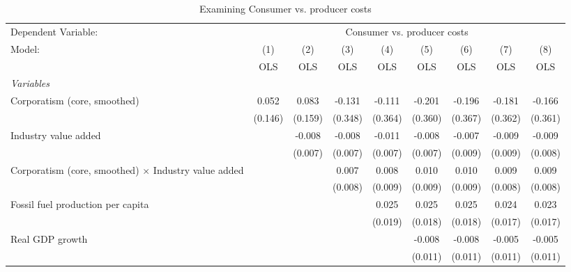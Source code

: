 
\begin{table}[htbp]
   \caption{Examining Consumer vs. producer costs}
   \centering
   \begin{tabular}{lcccccccc}
      \toprule
      Dependent Variable: & \multicolumn{8}{c}{Consumer vs. producer costs}\\
      Model:                                                      & (1)     & (2)     & (3)     & (4)     & (5)     & (6)     & (7)     & (8)\\  
                                                                  &  OLS    & OLS     & OLS     & OLS     & OLS     & OLS     & OLS     & OLS\\  
      \midrule
      \emph{Variables}\\
      Corporatism (core, smoothed)                                & 0.052   & 0.083   & -0.131  & -0.111  & -0.201  & -0.196  & -0.181  & -0.166\\   
                                                                  & (0.146) & (0.159) & (0.348) & (0.364) & (0.360) & (0.367) & (0.362) & (0.361)\\   
      Industry value added                                        &         & -0.008  & -0.008  & -0.011  & -0.008  & -0.007  & -0.009  & -0.009\\   
                                                                  &         & (0.007) & (0.007) & (0.007) & (0.007) & (0.009) & (0.009) & (0.008)\\   
      Corporatism (core, smoothed) $\times$ Industry value added  &         &         & 0.007   & 0.008   & 0.010   & 0.010   & 0.009   & 0.009\\   
                                                                  &         &         & (0.008) & (0.009) & (0.009) & (0.009) & (0.008) & (0.008)\\   
      Fossil fuel production per capita                           &         &         &         & 0.025   & 0.025   & 0.025   & 0.024   & 0.023\\   
                                                                  &         &         &         & (0.019) & (0.018) & (0.018) & (0.017) & (0.017)\\   
      Real GDP growth                                             &         &         &         &         & -0.008  & -0.008  & -0.005  & -0.005\\   
                                                                  &         &         &         &         & (0.011) & (0.011) & (0.011) & (0.011)\\   

\end{tabular}
\end{table}
